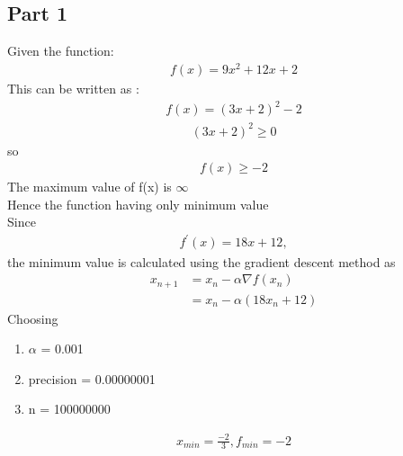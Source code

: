 \documentclass[journal,10pt,twocolumn]{article}
\providecommand{\brak}[1]{\ensuremath{\left(#1\right)}}
\begin{document}
\subsection*{Part 1}
Given the function:
\begin{align}
f(x) = 9x^2+12x+2 
\end{align}
This can be written as :
\begin{align}
f(x) = (3x+2)^2-2 
\end{align}
\begin{align}
(3x+2)^2\ge 0
\end{align}
so
\begin{align}
f(x) \ge-2 
\end{align}
The maximum value of f(x) is $\infty$ \vspace{5mm} \\
Hence the function having only minimum value \\
\fi
Since 
\begin{align}
	f^{\prime}(x) = 18x+12,
\end{align}
the minimum value is calculated using the gradient descent method as
\begin{align}
        x_{n+1} &= x_n - \alpha \nabla f(x_n) \\
	&= x_n - \alpha \brak{18x_n+12}
\end{align}
Choosing
\begin{enumerate}
\item $\alpha$ = 0.001
\item precision = 0.00000001
\item n = 100000000
\end{enumerate}
\begin{align} 
	x_{min}=\frac{-2}{3},
f_{min}=-2
\end{align}
\end{document}
